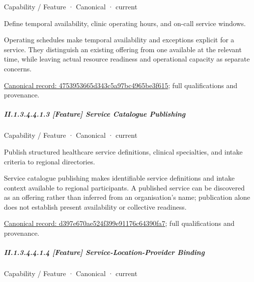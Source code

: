 \label{element:4753953665d343c5a97bc4965be3f615}
{\small Capability / Feature · Canonical · current}\par

Define temporal availability, clinic operating hours, and on-call service windows.



Operating schedules make temporal availability and exceptions explicit for a service. They distinguish an existing offering from one available at the relevant time, while leaving actual resource readiness and operational capacity as separate concerns.


{\footnotesize \href{../../../../../../../continuum/strategy/capability/feature/4753953665d343c5a97bc4965be3f615.md}{Canonical record: 4753953665d343c5a97bc4965be3f615}; full qualifications and provenance.}\par
\subparagraph*{II.1.3.4.4.1.3 [Feature] Service Catalogue Publishing}
\label{navigation:II.1.3.4.4.1.3}

\label{element:d397e670ae524f399e91176c64390fa7}
{\small Capability / Feature · Canonical · current}\par

Publish structured healthcare service definitions, clinical specialties, and intake criteria to regional directories.



Service catalogue publishing makes identifiable service definitions and intake context available to regional participants. A published service can be discovered as an offering rather than inferred from an organisation's name; publication alone does not establish present availability or collective readiness.


{\footnotesize \href{../../../../../../../continuum/strategy/capability/feature/d397e670ae524f399e91176c64390fa7.md}{Canonical record: d397e670ae524f399e91176c64390fa7}; full qualifications and provenance.}\par
\subparagraph*{II.1.3.4.4.1.4 [Feature] Service-Location-Provider Binding}
\label{navigation:II.1.3.4.4.1.4}

\label{element:37188bb916244f41b1b7d988ad52a2eb}
{\small Capability / Feature · Canonical · current}\par

